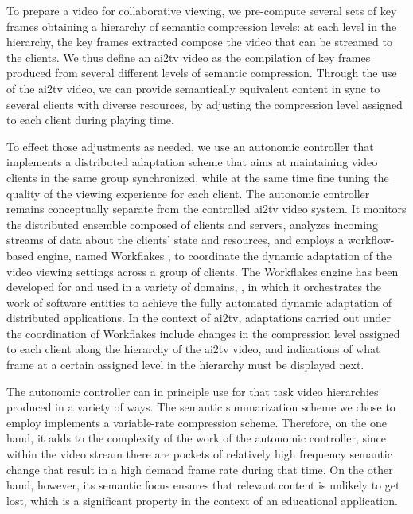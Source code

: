 \documentclass{sig-alternate}
\begin{document}
To prepare a video for collaborative viewing, we pre-compute several
sets of key frames obtaining a hierarchy of semantic compression
levels: at each level in the hierarchy, the key frames extracted
compose the video that can be streamed to the clients.  We thus define
an ai2tv video as the compilation of key frames produced from several
different levels of semantic compression.  Through the use of the
ai2tv video, we can provide semantically equivalent content in sync to
several clients with diverse resources, by adjusting the compression
level assigned to each client during playing time.

To effect those adjustments as needed, we use an autonomic controller
that implements a distributed adaptation scheme that aims at
maintaining video clients in the same group synchronized, while at the
same time fine tuning the quality of the viewing experience for each
client.  The autonomic controller remains conceptually separate from
the controlled ai2tv video system.  It monitors the distributed
ensemble composed of clients and servers, analyzes incoming streams of
data about the clients' state and resources, and employs a
workflow-based engine, named Workflakes \cite{PEPPO}, to coordinate
the dynamic adaptation of the video viewing settings across a group of
clients.  The Workflakes engine has been developed for and used in a
variety of domains, \cite{AMS}, in which it orchestrates the work of
software entities to achieve the fully automated dynamic adaptation of
distributed applications.  In the context of ai2tv, adaptations
carried out under the coordination of Workflakes include changes in
the compression level assigned to each client along the hierarchy of
the ai2tv video, and indications of what frame at a certain assigned
level in the hierarchy must be displayed next.

The autonomic controller can in principle use for that task video
hierarchies produced in a variety of ways.  The semantic summarization
scheme we chose to employ implements a variable-rate compression
scheme.  Therefore, on the one hand, it adds to the complexity of the
work of the autonomic controller, since within the video stream there
are pockets of relatively high frequency semantic change that result
in a high demand frame rate during that time.  On the other hand,
however, its semantic focus ensures that relevant content is unlikely
to get lost, which is a significant property in the context of an
educational application.
\end{document}
